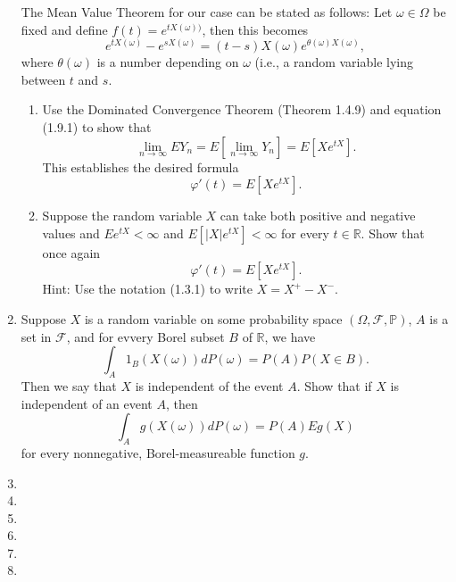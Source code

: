 \documentclass{article}
\newcommand{\R}{\mathbb{R}}
\begin{document}
\begin{enumerate}
	The Mean Value Theorem for our case can be stated as follows: Let $\omega \in \Omega$ be fixed and define $f(t) = e^{tX(\omega))}$, then this becomes
	$$
	e^{tX(\omega)} - e^{sX(\omega)} = (t - s)X(\omega)e^{\theta(\omega)X(\omega)},
	$$
	where $\theta(\omega)$ is a number depending on $\omega$ (i.e., a random variable lying between $t$ and $s$.
		\begin{enumerate}
			\item Use the Dominated Convergence Theorem (Theorem 1.4.9) and equation (1.9.1) to show that
			$$
			\lim_{n \rightarrow \infty} EY_n = E\left[\lim_{n \rightarrow \infty} Y_n\right] = E\left[Xe^{tX}\right].
			$$
			This establishes the desired formula
			$$
			\varphi'(t) = E\left[Xe^{tX}\right].
			$$
			\item Suppose the random variable $X$ can take both positive and negative values and $Ee^{tX} < \infty$ and $E[|X|e^{tX}] < \infty$ for every $t \in \R$. Show that once again
			$$
			\varphi'(t) = E\left[Xe^{tX}\right].
			$$
			Hint: Use the notation (1.3.1) to write $X = X^+ - X^-$.
		\end{enumerate}
	\item Suppose $X$ is a random variable on some probability space $(\Omega, \mathcal{F}, \mathbb{P})$, $A$ is a set in $\mathcal{F}$, and for evvery Borel subset $B$ of $\R$, we have
	$$
	\int_A 1_B(X(\omega))dP(\omega) = P(A)P(X \in B).
	$$
	Then we say that $X$ is independent of the event $A$. Show that if $X$ is independent of an event $A$, then
	$$
	\int_A g(X(\omega)) dP(\omega) = P(A) Eg(X)
	$$
	for every nonnegative, Borel-measureable function $g$.
	\item 
	\item 
	\item 
	\item 
	\item 
	\item 
\end{enumerate}
\end{document}
